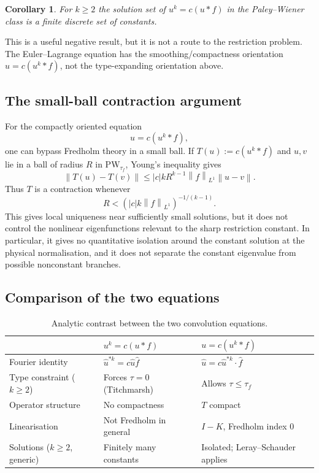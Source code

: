 \documentclass[12pt]{article}
\newtheorem{corollary}[theorem]{Corollary}
\theoremstyle{definition}
\theoremstyle{remark}
\newcommand{\PW}{\mathrm{PW}}
\newcommand{\wh}{\widehat}
\newcommand{\abs}[1]{\left|#1\right|}
\newcommand{\norm}[1]{\left\|#1\right\|}
\begin{document}
\begin{corollary}
  For $k\geq 2$ the solution set of $u^k=c(u\ast f)$ in the Paley--Wiener
  class is a finite discrete set of constants.
\end{corollary}

This is a useful negative result, but it is not a route to the restriction
problem.  The Euler--Lagrange equation has the smoothing/compactness
orientation $u=c(u^k\ast f)$, not the type-expanding orientation above.

\subsection{The small-ball contraction argument}

For the compactly oriented equation
\[
  u=c(u^k\ast f),
\]
one can bypass Fredholm theory in a small ball.  If
$T(u):=c(u^k\ast f)$ and $u,v$ lie in a ball of radius $R$ in
$\PW_{\tau_f}$, Young's inequality gives
\[
  \norm{T(u)-T(v)}
  \leq \abs{c}kR^{k-1}\norm{f}_{L^1}\norm{u-v}.
\]
Thus $T$ is a contraction whenever
\[
  R<(\abs{c}k\norm{f}_{L^1})^{-1/(k-1)}.
\]
This gives local uniqueness near sufficiently small solutions, but it does
not control the nonlinear eigenfunctions relevant to the sharp restriction
constant.  In particular, it gives no quantitative isolation around the
constant solution at the physical normalisation, and it does not separate
the constant eigenvalue from possible nonconstant branches.

\subsection{Comparison of the two equations}

\renewcommand{\arraystretch}{1.5}
\begin{table}[h]
\centering
\begin{tabular}{lll}
\hline
& $u^k=c(u\ast f)$ & $u=c(u^k\ast f)$ \\
\hline
Fourier identity & $\wh u^{\ast k}=c\wh u\wh f$ &
  $\wh u=c\wh u^{\ast k}\cdot\wh f$ \\
Type constraint ($k\geq 2$) & Forces $\tau=0$ (Titchmarsh) &
  Allows $\tau\leq\tau_f$ \\
Operator structure & No compactness & $T$ compact \\
Linearisation & Not Fredholm in general &
  $I-K$, Fredholm index $0$ \\
Solutions ($k\geq 2$, generic) &
  Finitely many constants & Isolated; Leray--Schauder applies \\
\hline
\end{tabular}
\caption{Analytic contrast between the two convolution equations.}
\end{table}
\end{document}
